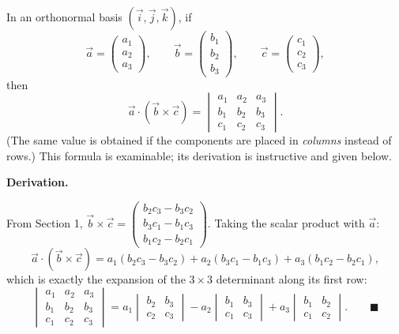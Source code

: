 \documentclass[11pt]{article}
\begin{document}
\begin{propriete}
In an orthonormal basis $(\vec{i}, \vec{j}, \vec{k})$, if
\[
\vec{a} = \begin{pmatrix} a_1 \\ a_2 \\ a_3 \end{pmatrix}, \qquad
\vec{b} = \begin{pmatrix} b_1 \\ b_2 \\ b_3 \end{pmatrix}, \qquad
\vec{c} = \begin{pmatrix} c_1 \\ c_2 \\ c_3 \end{pmatrix},
\]
then
\[
\vec{a} \cdot (\vec{b} \times \vec{c}) =
\begin{vmatrix}
a_1 & a_2 & a_3 \\
b_1 & b_2 & b_3 \\
c_1 & c_2 & c_3
\end{vmatrix}.
\]
(The same value is obtained if the components are placed in \emph{columns} instead of rows.) This formula is examinable; its derivation is instructive and given below.
\end{propriete}

\textbf{Derivation.}\par
From Section 1, $\vec{b} \times \vec{c} = \begin{pmatrix} b_2 c_3 - b_3 c_2 \\ b_3 c_1 - b_1 c_3 \\ b_1 c_2 - b_2 c_1 \end{pmatrix}$. Taking the scalar product with $\vec{a}$:
\[
\vec{a} \cdot (\vec{b} \times \vec{c}) = a_1(b_2 c_3 - b_3 c_2) + a_2(b_3 c_1 - b_1 c_3) + a_3(b_1 c_2 - b_2 c_1),
\]
which is exactly the expansion of the $3 \times 3$ determinant along its first row:
\[
\begin{vmatrix}
a_1 & a_2 & a_3 \\
b_1 & b_2 & b_3 \\
c_1 & c_2 & c_3
\end{vmatrix}
= a_1 \begin{vmatrix} b_2 & b_3 \\ c_2 & c_3 \end{vmatrix}
- a_2 \begin{vmatrix} b_1 & b_3 \\ c_1 & c_3 \end{vmatrix}
+ a_3 \begin{vmatrix} b_1 & b_2 \\ c_1 & c_2 \end{vmatrix}. \qquad \blacksquare
\]
\end{document}
